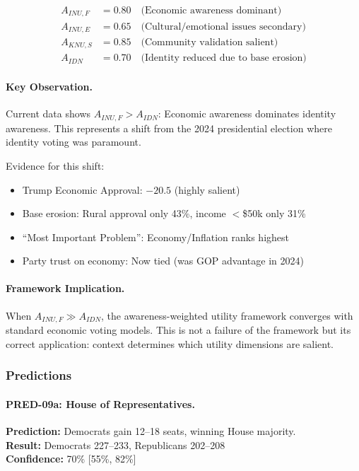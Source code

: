 \begin{align}
A_{INU,F} &= 0.80 \quad \text{(Economic awareness dominant)} \\
A_{INU,E} &= 0.65 \quad \text{(Cultural/emotional issues secondary)} \\
A_{KNU,S} &= 0.85 \quad \text{(Community validation salient)} \\
A_{IDN} &= 0.70 \quad \text{(Identity reduced due to base erosion)}
\end{align}

\paragraph{Key Observation.}
Current data shows $A_{INU,F} > A_{IDN}$: Economic awareness dominates 
identity awareness. This represents a shift from the 2024 presidential 
election where identity voting was paramount.

Evidence for this shift:
\begin{itemize}
    \item Trump Economic Approval: $-20.5$ (highly salient)
    \item Base erosion: Rural approval only 43\%, income $<$\$50k only 31\%
    \item ``Most Important Problem'': Economy/Inflation ranks highest
    \item Party trust on economy: Now tied (was GOP advantage in 2024)
\end{itemize}

\paragraph{Framework Implication.}
When $A_{INU,F} \gg A_{IDN}$, the awareness-weighted utility framework 
converges with standard economic voting models. This is not a failure 
of the framework but its correct application: context determines which 
utility dimensions are salient.

\subsubsection{Predictions}

\paragraph{PRED-09a: House of Representatives.}

\begin{tcolorbox}[colback=blue!5!white, colframe=blue!75!black, title=PRED-09a: House]
\textbf{Prediction:} Democrats gain 12--18 seats, winning House majority. \\
\textbf{Result:} Democrats 227--233, Republicans 202--208 \\
\textbf{Confidence:} 70\% [55\%, 82\%]
\end{tcolorbox}

